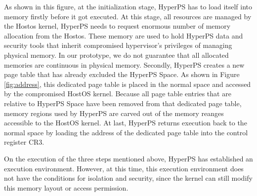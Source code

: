 As shown in this figure, at the initialization stage, HyperPS has to load itself into memory firstly before it got executed. 
At this stage, all resources are managed by the Hostos kernel, HyperPS needs to request enormous number of memory allocation from the Hostos. These memory are used to hold HyperPS data and security tools that inherit compromised hypervisor's privileges of managing physical memory. 
In our prototype, we do not guarantee that all allocated memories are continuous in physical memory. 
Secondly, HyperPS creates a new page table that has already excluded the HyperPS Space. As shown in Figure \ref{fig:address}, this dedicated page table is placed in the normal space and accessed by the compromised HostOS kernel. 
Because all page table entries that are relative to HyperPS Space have been removed from that dedicated page table, 
memory regions used by HyperPS are carved out of the memory reanges accessible to the HostOS kernel. 
At last, HyperPS returns execution back to the normal space by loading the address of the dedicated page table into the control register CR3. 

On the execution of the three steps mentioned above, HyperPS has established an execution environment. 
However, at this time, this execution environment does not have the conditions for isolation and security, since the kernel can still modify this memory layout or access permission. 


